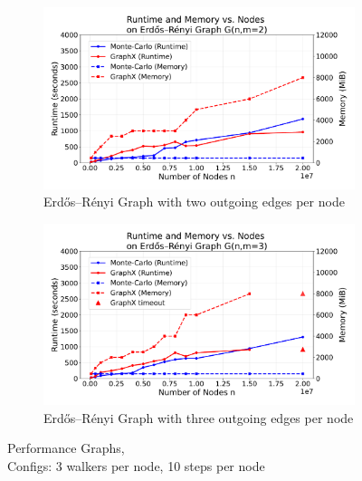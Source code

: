 \begin{figure}[H]
    \centering
    \begin{subfigure}[t]{0.5\linewidth}
        \centering
        \includegraphics[width=\linewidth]{images/plots/ER_2edg/combined_runtime_memory_vs_nodes_2edges_gx_mc.pdf}
        \caption{Erdős–Rényi Graph with two outgoing edges per node}
        \label{fig:wikigibhrs}
    \end{subfigure}
    \begin{subfigure}[t]{0.5\linewidth}
        \centering
        \includegraphics[width=\linewidth]{images/plots/ER_3edg/combined_runtime_memory_vs_nodes_3edges_gx_mc.pdf}
        \caption{Erdős–Rényi Graph with three outgoing edges per node}
        \label{fig:wikigibhrs}
    \end{subfigure}
    \caption{Performance Graphs,\\Configs: 3 walkers per node, 10 steps per node}
    \label{fig:wiki-comparison}
\end{figure}



